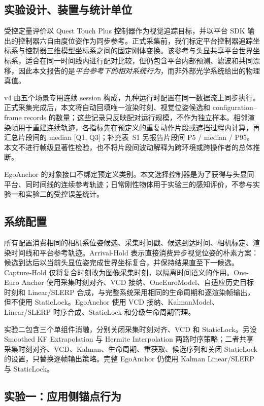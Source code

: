 \documentclass[review]{vgtc}
\begin{document}
\subsection{实验设计、装置与统计单位}

受控定量评价以 Quest Touch Plus 控制器作为视觉追踪目标，并以平台 SDK 输出的控制器六自由度位姿作为同步参考。正式采集前，我们标定平台控制器追踪坐标系与控制器三维模型坐标系之间的固定刚体变换。该参考与头显共享平台世界坐标系，适合在同一时间线内进行配对比较，但仍包含平台内部预测、滤波和共同漂移，因此本文报告的是\emph{平台参考下的相对系统行为}，而非外部光学系统给出的物理真值。

v4 由五个场景专用连续 session 构成，九种运行时配置在同一数据流上同步执行。正式采集完成后，本文将自动回填唯一渲染时刻、视觉位姿候选和 configuration--frame records 的数量；这些记录只反映配对运行规模，不作为独立样本。相邻渲染帧用于重建连续轨迹，各指标先在预定义的重复动作片段或遮挡过程内计算，再汇总片段间的 median [Q1, Q3]；补充表~S1 另报告片段间 P5 / median / P95。本文不进行帧级显著性检验，也不将片段间波动解释为跨环境或跨操作者的总体推断。

EgoAnchor 的对象接口不绑定预定义类别。本文选择控制器是为了获得与头显同平台、同时间线的连续参考轨迹；日常刚性物体用于实验三的感知评价，不参与实验一和实验二的受控误差统计。

\subsection{系统配置}

所有配置消费相同的相机系位姿候选、采集时间戳、候选到达时间、相机标定、渲染时间线和平台参考轨迹。Arrival-Hold 表示直接消费异步视觉位姿的朴素方案：候选到达后以当前头显位姿完成世界坐标复合，并保持结果直至下一候选。Capture-Hold 仅将复合时刻改为图像采集时刻，以隔离时间语义的作用。One-Euro Anchor 使用采集时刻对齐、VCD 接纳、OneEuroModel、自适应历史目标时刻和 Linear/SLERP 合成，与完整系统采用相同的生命周期和逐渲染帧输出，但不使用 StaticLock。EgoAnchor 使用 VCD 接纳、KalmanModel、Linear/SLERP 时序合成、StaticLock 和分级生命周期管理。

实验二包含三个单组件消融，分别关闭采集时刻对齐、VCD 和 StaticLock。另设 Smoothed KF Extrapolation 与 Hermite Interpolation 两路时序策略；二者共享采集时刻对齐、VCD、Kalman、生命周期、重获取、候选序列和关闭 StaticLock 的设置，只替换逐帧输出策略。完整 EgoAnchor 仍使用 Kalman Linear/SLERP 与 StaticLock。


\subsection{实验一：应用侧锚点行为}
\end{document}

